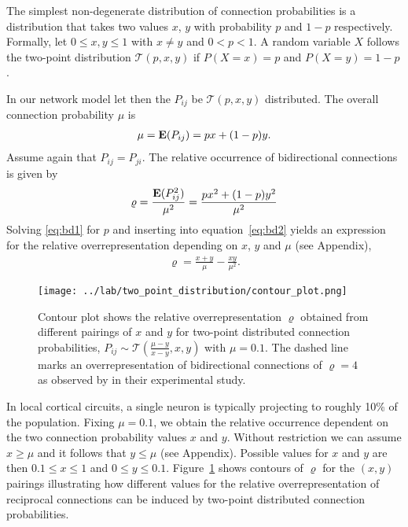 
The simplest non-degenerate distribution of connection probabilities is a distribution that takes two values $x$, $y$ with probability $p$ and $1-p$ respectively. Formally, let $0 \leq x,y \leq 1$ with $x \neq y$  and $0 < p < 1$. A random variable $X$ follows the two-point distribution %
$\mathcal{T}(p,x,y)$ if $P(X=x)=p$ and $P(X=y) = 1-p$. 

In our network model let then the $P_{ij}$ be $\mathcal{T}(p,x,y)$ distributed. The overall connection probability $\mu$ is
\begin{align}
\mu = \operatorname{\mathbf{E}}(P_{ij}) = px + (1-p)y. \label{eq:bd1}
\end{align}
Assume again that $P_{ij} = P_{ji}$. The relative occurrence of bidirectional connections is given by
\begin{align}
  \varrho = \frac{\operatorname{\mathbf{E}}(P_{ij}^2)}{\mu^2} = \frac{p x^2 + (1-p) y^2}{\mu^2} \label{eq:bd2}
\end{align}
Solving \eqref{eq:bd1} for $p$ and inserting into equation~\eqref{eq:bd2} yields an expression for the relative overrepresentation depending on $x$, $y$ and $\mu$ (see Appendix),
\begin{align}
\varrho = \frac{x+y}{\mu} - \frac{xy}{\mu^2}.
\end{align}

\begin{figure}[h!]
\centering
\texttt{[image: ../lab/two\_point\_distribution/contour\_plot.png]}
\caption{Contour plot shows the relative overrepresentation $\varrho$ obtained from different pairings of $x$ and $y$ for two-point distributed connection probabilities, $P_{ij} \sim \mathcal{T}(\frac{\mu-y}{x-y},x,y)$ with $\mu = 0.1$. The dashed line marks an overrepresentation of bidirectional connections of $\varrho=4$ as observed by \textcite{Song2005} in their experimental study.}
\label{fig:tp}
\end{figure}

In local cortical circuits, a single neuron is typically projecting to roughly 10\% of the population. Fixing $\mu = 0.1$, we obtain the relative occurrence dependent on the two connection probability values $x$ and $y$. Without restriction we can assume $x \geq \mu$ and it follows that $y \leq \mu$ (see Appendix). Possible values for $x$ and $y$ are then $0.1 \leq x \leq 1$ and $0 \leq y \leq 0.1$. Figure~\ref{fig:tp} shows contours of $\varrho$ for the $(x,y)$ pairings illustrating how different values for the relative overrepresentation of reciprocal connections can be induced by two-point distributed connection probabilities.  





